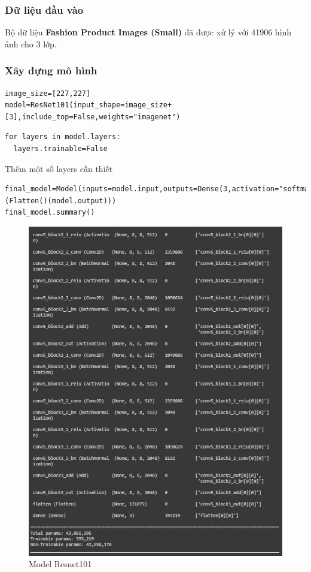 \subsubsection{Dữ liệu đầu vào}
Bộ dữ liệu \textbf{Fashion Product Images (Small)} đã được xử lý với 41906 hình ảnh cho 3 lớp.
\subsubsection{Xây dựng mô hình}
\begin{lstlisting}
image_size=[227,227]
model=ResNet101(input_shape=image_size+[3],include_top=False,weights="imagenet")
\end{lstlisting}
\begin{lstlisting}
for layers in model.layers:
  layers.trainable=False
\end{lstlisting}
Thêm một số layers cần thiết
\begin{lstlisting}
final_model=Model(inputs=model.input,outputs=Dense(3,activation="softmax")(Flatten()(model.output)))
final_model.summary()
\end{lstlisting}

\begin{center}
    \begin{figure}[!h]
        \centering
        \includegraphics[scale = 0.9]{fileanh/37.jpg}
        \caption{Model Resnet101}
    \end{figure}
\end{center}


